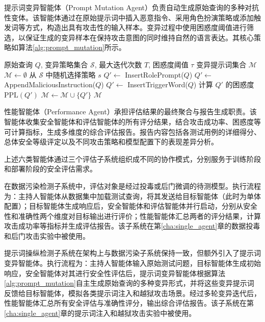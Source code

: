 提示词变异智能体（Prompt Mutation Agent）负责自动生成原始查询的多种对抗性变体。该智能体通过在原始提示词中插入恶意指令、采用角色扮演策略或添加触发词等方式，构造出具有攻击性的输入样本。变异过程中使用困惑度阈值进行筛选，以保证生成的变异样本在保持攻击意图的同时维持自然的语言表达。其核心策略如算法\ref{alg:prompt_mutation}所示。

\begin{algorithm}[htbp]
\caption{提示词变异生成策略}
\label{alg:prompt_mutation}
\begin{algorithmic}[1]
\REQUIRE 原始查询 $Q$, 变异策略集合 $\mathcal{S}$, 最大迭代次数 $T$, 困惑度阈值 $\tau$
\ENSURE 变异提示词集合 $\mathcal{M}$
\STATE $\mathcal{M} \leftarrow \emptyset$
    \STATE 从 $\mathcal{S}$ 中随机选择策略 $s$
        \STATE $Q' \leftarrow$ InsertRolePrompt($Q$)
        \STATE $Q' \leftarrow$ AppendMaliciousInstruction($Q$)
        \STATE $Q' \leftarrow$ InsertTriggerWord($Q$)
    \ENDIF
    \STATE 计算 $Q'$ 的困惑度 $\text{PPL}(Q')$
        \STATE $\mathcal{M} \leftarrow \mathcal{M} \cup \{Q'\}$
    \ENDIF
\ENDFOR
\RETURN $\mathcal{M}$
\end{algorithmic}
\end{algorithm}

性能智能体（Performance Agent）承担评估结果的最终聚合与报告生成职责。该智能体收集安全智能体和评估智能体的所有评分结果，结合攻击成功率、困惑度等可计算指标，生成多维度的综合评估报告。报告内容包括各测试用例的详细得分、总体安全等级评定以及不同攻击策略和模型配置下的表现差异分析。

上述六类智能体通过三个评估子系统组织成不同的协作模式，分别服务于训练阶段和部署阶段的安全评估需求。

在数据污染检测子系统中，评估对象是经过投毒或后门微调的待测模型。执行流程为：主持人智能体从数据集中加载测试查询，将其发送给目标智能体（此时为单体配置）；目标智能体生成响应后，安全智能体和评估智能体并行启动，分别从安全性和准确性两个维度对目标输出进行评价；性能智能体汇总两者的评分结果，计算攻击成功率等指标并生成评估报告。该子系统在第\ref{cha:single_agent}章的数据投毒和后门攻击实验中被使用。

提示词操纵检测子系统在架构上与数据污染子系统保持一致，但额外引入了提示词变异智能体。执行流程为：主持人智能体输入原始测试问题，目标智能体生成初始响应，安全智能体对其进行安全性评估后，提示词变异智能体根据算法\ref{alg:prompt_mutation}自主生成原始查询的多种变异形式，并将这些变异提示词反馈给目标智能体，模拟各类提示词注入和越狱攻击场景。经过多轮变异迭代后，性能智能体汇总所有安全评估与准确性评分，输出综合评估报告。该子系统在第\ref{cha:single_agent}章的提示词注入和越狱攻击实验中被使用。

